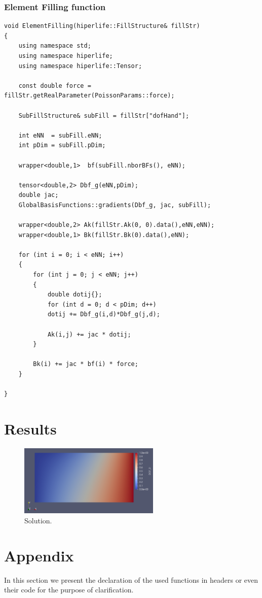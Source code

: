 \documentclass[]{article}
\begin{document}
\subsubsection{Element Filling function} \label{sec: elff}
\begin{lstlisting}[firstnumber=92]
void ElementFilling(hiperlife::FillStructure& fillStr)
{
	using namespace std;
	using namespace hiperlife;
	using namespace hiperlife::Tensor;

	const double force = fillStr.getRealParameter(PoissonParams::force);
		
	SubFillStructure& subFill = fillStr["dofHand"];

	int eNN  = subFill.eNN;
	int pDim = subFill.pDim;
		
	wrapper<double,1>  bf(subFill.nborBFs(), eNN);
		
	tensor<double,2> Dbf_g(eNN,pDim);
	double jac;
	GlobalBasisFunctions::gradients(Dbf_g, jac, subFill);
		
	wrapper<double,2> Ak(fillStr.Ak(0, 0).data(),eNN,eNN);
	wrapper<double,1> Bk(fillStr.Bk(0).data(),eNN);
		
	for (int i = 0; i < eNN; i++)
	{
		for (int j = 0; j < eNN; j++)
		{
			double dotij{};
			for (int d = 0; d < pDim; d++)
			dotij += Dbf_g(i,d)*Dbf_g(j,d);
				
			Ak(i,j) += jac * dotij;
		}
			
		Bk(i) += jac * bf(i) * force;
	}
		
}
\end{lstlisting}
\section{Results} \label{sec: rst}
\begin{figure}[htbp]
	\centering
	\includegraphics[width=0.6\textwidth]{Figures/result.png}
	\caption{Solution.}
	\label{fig_rst}
\end{figure}
\pagebreak
\section*{Appendix} \label{sec: apx}
In this section we present the declaration of the used functions in headers or even their code for the purpose of clarification.
\end{document}
